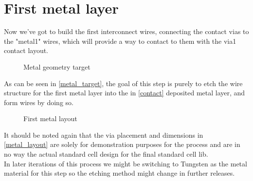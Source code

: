 \section{First metal layer}\label{metal}

Now we've got to build the first interconnect wires, connecting the contact vias to the "metal1" wires, which will provide a way to contact to them with the via1 contact layout.

\begin{figure}[H]
	\centering
	\begin{tikzpicture}[node distance = 3cm, auto, thick,scale=\CrossAndTopSectionBig, every node/.style={transform shape}]
		
	\end{tikzpicture}
	\begin{tikzpicture}[node distance = 3cm, auto, thick,scale=\CrossAndTopSectionBig, every node/.style={transform shape}]
		
	\end{tikzpicture}
	\caption{Metal geometry target}
	\label{metal_target}
\end{figure}

As can be seen in \autoref{metal_target}, the goal of this step is purely to etch the wire structure for the first metal layer into the in \autoref{contact} deposited metal layer, and form wires by doing so.

\begin{figure}[H]
	\centering
	\begin{tikzpicture}[node distance =1cm, auto, thick,scale=\VLSILayout, every node/.style={transform shape}]
		
	\end{tikzpicture}
	\caption{First metal layout}
	\label{metal_layout}
\end{figure}

It should be noted again that the via placement and dimensions in \autoref{metal_layout} are solely for demonstration purposes for the process and are in no way the actual standard cell design for the final standard cell lib. \\

In later iterations of this process we might be switching to Tungsten as the metal material for this step so the etching method might change in further releases.


